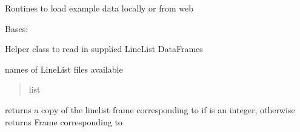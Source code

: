 \documentclass[letterpaper,10pt,english]{sphinxmanual}
\begin{document}
\label{\detokenize{MATS:module-MATS.linelistdata}}
\sphinxAtStartPar
Routines to load example data locally or from web

\begin{fulllineitems}
\label{\detokenize{MATS:MATS.linelistdata.LoadLineListData}}
\pysigstartsignatures
{}
\pysigstopsignatures
\sphinxAtStartPar
Bases: 

\sphinxAtStartPar
Helper class to read in supplied LineList DataFrames

\begin{fulllineitems}
\label{\detokenize{MATS:MATS.linelistdata.LoadLineListData.names}}
\pysigstartsignatures
{}
\pysigstopsignatures
\sphinxAtStartPar
names of LineList files available
\begin{quote}\begin{description}
\sphinxAtStartPar
list

\end{description}\end{quote}

\end{fulllineitems}



\begin{fulllineitems}

\pysigstartsignatures
{}
\pysigstopsignatures
\sphinxAtStartPar
{} returns a copy of the linelist frame corresponding to
 if  is an integer, otherwise returns Frame corresponding to 

\end{fulllineitems}


\end{fulllineitems}
\end{document}
